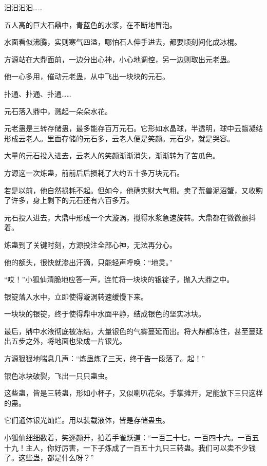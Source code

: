 
\begin{this_body}



汩汩汩汩……

五人高的巨大石鼎中，青蓝色的水浆，在不断地冒泡。

水面看似沸腾，实则寒气四溢，哪怕石人伸手进去，都要顷刻间化成冰棍。

方源站在大鼎面前，一边分出心神，小心地调控，另一边则取出元老蛊。

他一心多用，催动元老蛊，从中飞出一块块的元石。

扑通、扑通、扑通……

元石落入鼎中，溅起一朵朵水花。

元老蛊是三转存储蛊，最多能存百万元石。它形如水晶球，半透明，球中云翳凝结形成云老人。里面存储的元石多，云老人便是笑颜。元石少，就是哭容。

大量的元石投入进去，云老人的笑颜渐渐消失，渐渐转为了苦瓜色。

方源这一次炼蛊，前前后后损耗了大约五十多万块元石。

若是以前，他自然损耗不起。但如今，他确实财大气粗。卖了荒兽泥沼蟹，又收购了许多，身上剩下的元石还有六百多万。

元石投入进去，大鼎中形成一个大漩涡，搅得水浆急速旋转。大鼎都在微微颤抖着。

炼蛊到了关键时刻，方源投注全部心神，无法再分心。

他的额头，很快就渗出汗滴，只能轻声呼唤：“地灵。”

“哎！”小狐仙清脆地应答一声，连忙将一块块的银锭子，抛入大鼎之中。

银锭落入水中，立即使得漩涡转速缓慢下来。

一块块的银锭，终于使得鼎中水面平静，结成银色的坚实冰块。

最后，鼎中水液彻底被冻结，大量银色的气雾蔓延而出。将大鼎都冻住，甚至蔓延出五步之外，将地面也染成一片银光。

方源狠狠地喘息几声：“炼蛊炼了三天，终于告一段落了。起！”

银色冰块破裂，飞出一只只蛊虫。

这些蛊，皆是三转蛊，形如小杯子，又似喇叭花朵。手掌摊开，足能放下三只这样的蛊。

它们通体银光灿烂。用以装载液体，皆是存储蛊虫。

小狐仙细细数着，笑逐颜开，拍着手雀跃道：“一百三十七，一百四十六。一百五十九！主人，你好厉害，一下子炼成了一百五十九只三转蛊。我们可以卖不少钱了。这些蛊，都是什么呀？”


\end{this_body}
